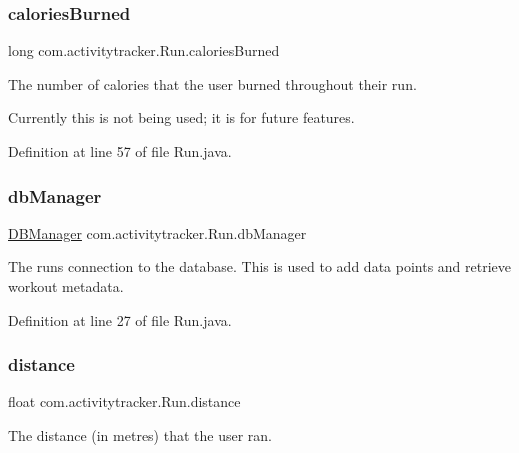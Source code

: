 \subsubsection{\texorpdfstring{calories\+Burned}{caloriesBurned}}
{\footnotesize\ttfamily long com.\+activitytracker.\+Run.\+calories\+Burned\hspace{0.3cm}{\ttfamily [private]}}

The number of calories that the user burned throughout their run.

Currently this is not being used; it is for future features. 

Definition at line 57 of file Run.\+java.

\mbox{\label{classcom_1_1activitytracker_1_1_run_ab90e32eda9f4c671ae3575f971edca6b}} 
\subsubsection{\texorpdfstring{db\+Manager}{dbManager}}
{\footnotesize\ttfamily \mbox{\hyperlink{classcom_1_1activitytracker_1_1_d_b_manager}{D\+B\+Manager}} com.\+activitytracker.\+Run.\+db\+Manager\hspace{0.3cm}{\ttfamily [private]}}

The run\textquotesingle{}s connection to the database. This is used to add data points and retrieve workout metadata. 

Definition at line 27 of file Run.\+java.

\mbox{\label{classcom_1_1activitytracker_1_1_run_a7b4ca8c4ecea4da1653f03b8c8fc16a8}} 
\subsubsection{\texorpdfstring{distance}{distance}}
{\footnotesize\ttfamily float com.\+activitytracker.\+Run.\+distance\hspace{0.3cm}{\ttfamily [private]}}

The distance (in metres) that the user ran. 


